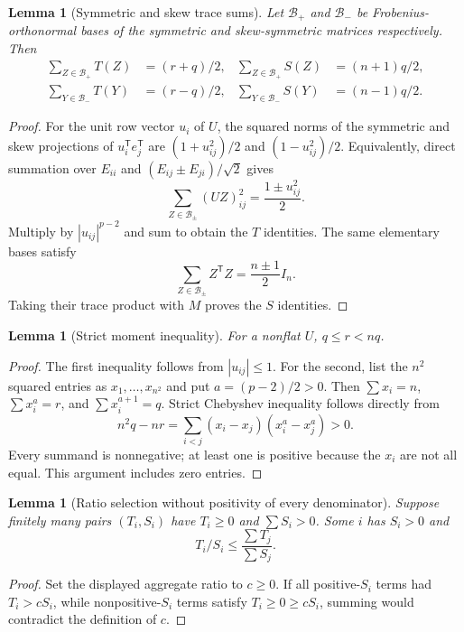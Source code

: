 \documentclass[11pt]{article}
\newtheorem{lemma}[theorem]{Lemma}
\begin{document}
\begin{lemma}[Symmetric and skew trace sums]\label{lem:traces}
Let $\mathcal B_+$ and $\mathcal B_-$ be Frobenius-orthonormal bases
of the symmetric and skew-symmetric matrices respectively. Then
\begin{align*}
 \sum_{Z\in\mathcal B_+}T(Z)&=(r+q)/2,&
 \sum_{Z\in\mathcal B_+}S(Z)&=(n+1)q/2,\\
 \sum_{Y\in\mathcal B_-}T(Y)&=(r-q)/2,&
 \sum_{Y\in\mathcal B_-}S(Y)&=(n-1)q/2.
\end{align*}
\end{lemma}
\begin{proof}
For the unit row vector $u_i$ of $U$, the squared norms of the
symmetric and skew projections of $u_i^{\mathsf T}e_j^{\mathsf T}$
are $(1+u_{ij}^2)/2$ and $(1-u_{ij}^2)/2$. Equivalently, direct
summation over $E_{ii}$ and $(E_{ij}\pm E_{ji})/\sqrt2$ gives
\[
 \sum_{Z\in\mathcal B_\pm}(UZ)_{ij}^2
 =\frac{1\pm u_{ij}^2}{2}.
\]
Multiply by $|u_{ij}|^{p-2}$ and sum to obtain the $T$ identities.
The same elementary bases satisfy
\[
 \sum_{Z\in\mathcal B_\pm}Z^{\mathsf T}Z
 =\frac{n\pm1}{2}I_n.
\]
Taking their trace product with $M$ proves the $S$ identities.
\end{proof}

\begin{lemma}[Strict moment inequality]\label{lem:cheb}
For a nonflat $U$, $q\le r<nq$.
\end{lemma}
\begin{proof}
The first inequality follows from $|u_{ij}|\le1$. For the second,
list the $n^2$ squared entries as $x_1,\ldots,x_{n^2}$ and put
$a=(p-2)/2>0$. Then $\sum x_i=n$, $\sum x_i^a=r$, and
$\sum x_i^{a+1}=q$. Strict Chebyshev inequality follows directly from
\[
 n^2q-nr
 =\sum_{i<j}(x_i-x_j)(x_i^a-x_j^a)>0.
\]
Every summand is nonnegative; at least one is positive because the
$x_i$ are not all equal. This argument includes zero entries.
\end{proof}

\begin{lemma}[Ratio selection without positivity of every denominator]
Suppose finitely many pairs $(T_i,S_i)$ have $T_i\ge0$ and
$\sum S_i>0$. Some $i$ has $S_i>0$ and
\[
 T_i/S_i\le\frac{\sum T_j}{\sum S_j}.
\]
\end{lemma}
\begin{proof}
Set the displayed aggregate ratio to $c\ge0$. If all positive-$S_i$
terms had $T_i>cS_i$, while nonpositive-$S_i$ terms satisfy
$T_i\ge0\ge cS_i$, summing would contradict the definition of $c$.
\end{proof}
\end{document}
